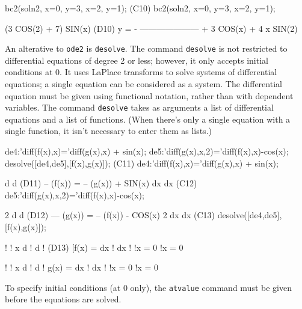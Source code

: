 \documentclass{article}
\begin{document}
\beginmaximasession
bc2(soln2, x=0, y=3, x=2, y=1);
\maximasession
(C10) bc2(soln2, x=0, y=3, x=2, y=1);


                       (3 COS(2) + 7) SIN(x)
(D10)            y = - --------------------- + 3 COS(x) + 4 x
                              SIN(2)
\endmaximasession

An alterative to \texttt{ode2} is \texttt{desolve}.  The command
\texttt{desolve} is not restricted to differential equations of degree
2 or less; however, it only accepts initial conditions at 0.  It uses
LaPlace transforms to solve systems of differential equations; a
single equation can be considered as a system.  The differential
equation must be given using functional notation, rather than with
dependent variables.  The command \texttt{desolve} takes as arguments
a list of differential equations and a list of functions.  (When
there's only a single equation with a single function, it isn't
necessary to enter them as lists.)


\beginmaximasession
de4:'diff(f(x),x)='diff(g(x),x) + sin(x);
de5:'diff(g(x),x,2)='diff(f(x),x)-cos(x);
desolve([de4,de5],[f(x),g(x)]);
\maximasession
(C11) de4:'diff(f(x),x)='diff(g(x),x) + sin(x);


                        d           d
(D11)                   -- (f(x)) = -- (g(x)) + SIN(x)
                        dx          dx
(C12) de5:'diff(g(x),x,2)='diff(f(x),x)-cos(x);


                         2
                        d            d
(D12)                   --- (g(x)) = -- (f(x)) - COS(x)
                          2          dx
                        dx
(C13) desolve([de4,de5],[f(x),g(x)]);


                            !                  !
                x  d        !         d        !
(D13) [f(x) = %
                   dx       !         dx       !
                            !x = 0             !x = 0

                                 !                  !
                     x  d        !         d        !
            g(x) = %
                        dx       !         dx       !
                                 !x = 0             !x = 0
\endmaximasession

To specify initial conditions (at 0 only), the \texttt{atvalue}
command must be given before the equations are solved.
\end{document}
